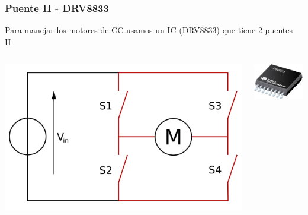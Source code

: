 \documentclass[compress]{beamer}
\begin{document}
\begin{frame}
 \frametitle{Puente H - DRV8833}
Para manejar los motores de CC usamos un IC (DRV8833) que tiene 2 puentes H.
\begin{columns}
\begin{center}
 \includegraphics[width=\columnwidth]{./img/puenteH_1.png}
\end{center}
\begin{center}
 \includegraphics[width=\columnwidth]{./img/drv8833.jpg}
\end{center}

\end{columns}
\end{frame}
\end{document}
